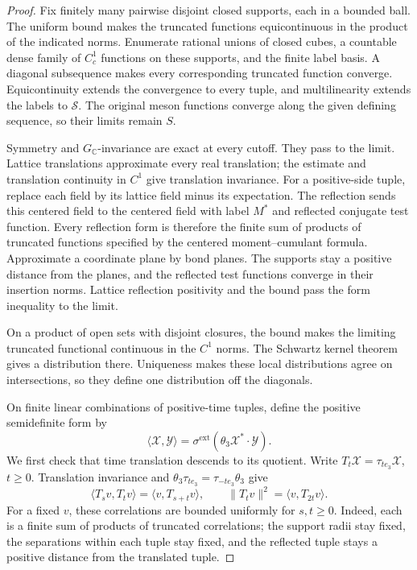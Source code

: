 \documentclass[11pt,letterpaper,reqno]{amsart}
\theoremstyle{definition}
\theoremstyle{remark}
\begin{document}
\begin{proof}
Fix finitely many pairwise disjoint closed supports,
each in a bounded ball. The uniform bound makes the
truncated functions equicontinuous in the product of
the indicated norms. Enumerate rational unions of
closed cubes, a countable dense family of $C_c^1$
functions on these supports, and the finite label
basis. A diagonal subsequence makes every corresponding
truncated function converge. Equicontinuity extends
the convergence to every tuple, and multilinearity
extends the labels to $\mathscr S$. The original
meson functions converge along the given defining
sequence, so their limits remain $S$.

Symmetry and $G_{\mathbb C}$-invariance are exact at
every cutoff. They pass to the limit. Lattice
translations approximate every real translation;
the estimate and translation continuity in $C^1$
give translation invariance. For a positive-side
tuple, replace each field by its lattice field minus
its expectation. The reflection sends this centered
field to the centered field with label $M^*$ and
reflected conjugate test function. Every reflection
form is therefore the finite sum of products of
truncated functions specified by the centered
moment--cumulant formula. Approximate a coordinate
plane by bond planes. The supports stay a positive
distance from the planes, and the reflected test
functions converge in their insertion norms. Lattice
reflection positivity and the bound pass the form
inequality to the limit.

On a product of open sets with disjoint closures,
the bound makes the limiting truncated functional continuous in
the $C^1$ norms. The Schwartz kernel theorem gives
a distribution there. Uniqueness makes these local
distributions agree on intersections, so they define
one distribution off the diagonals.

On finite linear combinations of positive-time tuples,
define the positive semidefinite form by
\[
 \langle\mathcal X,\mathcal Y\rangle
    =\sigma^{\mathrm{ext}}(\theta_3\mathcal X^*\cdot\mathcal Y).
\]
We first check that time translation descends to its quotient.
Write $T_t\mathcal X=\tau_{te_3}\mathcal X$, $t\ge0$.
Translation invariance and $\theta_3\tau_{te_3}
=\tau_{-te_3}\theta_3$ give
\[
 \langle T_sv,T_tv\rangle=\langle v,T_{s+t}v\rangle,
 \qquad \|T_tv\|^2=\langle v,T_{2t}v\rangle.
\]
For a fixed $v$, these correlations are bounded uniformly
for $s,t\ge0$. Indeed, each is a finite sum of products of
truncated correlations; the support radii stay fixed, the
separations within each tuple stay fixed, and the reflected
tuple stays a positive distance from the translated tuple.


\end{proof}
\end{document}
